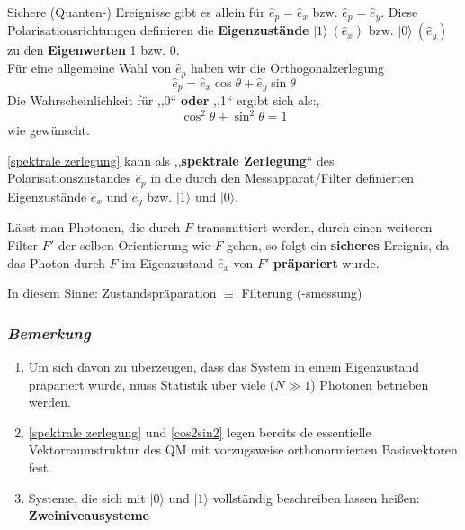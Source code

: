 
\noindent
Sichere (Quanten-) Ereignisse gibt es allein für $ \hat{e}_p = \hat{e}_x $ bzw. $ \hat{e}_p = \hat{e}_y $. Diese Polarisationsrichtungen definieren die \textbf{Eigenzustände} $ |1\rangle \ (\hat{e}_x) $ bzw. $ |0\rangle \ (\hat{e}_y) $ zu den \textbf{Eigenwerten} 1 bzw. 0.\\[10pt]
Für eine allgemeine Wahl von $ \hat{e}_p $ haben wir die Orthogonalzerlegung 
\begin{equation}
\hat{e}_p = \hat{e}_x \cos\theta + \hat{e}_y \sin 
\theta
\label{spektrale zerlegung}
\end{equation}
Die Wahrscheinlichkeit für ,,0`` \textbf{oder} ,,1`` ergibt sich als:,
\begin{equation}
\cos^2 \theta + \sin^2 \theta = 1
\label{cos2sin2}
\end{equation}
wie gewünscht.\par
\eqref{spektrale zerlegung} kann als ,,\textbf{spektrale Zerlegung}`` des Polarisationszustandes $ \hat{e}_p $ in die durch den Messapparat/Filter definierten Eigenzustände $ \hat{e}_x $ und $ \hat{e}_y $ bzw. $ |1\rangle $ und $ |0\rangle $.\par
Lässt man Photonen, die durch $ F $ transmittiert werden, durch einen weiteren Filter $ F' $ der selben Orientierung wie $ F $ gehen, so folgt ein \textbf{sicheres} Ereignis, da das Photon durch $ F $ im Eigenzustand $ \hat{e}_x $ von $ F' $ \textbf{präpariert} wurde.\par
In diesem Sinne: Zustandspräparation $ \equiv $ Filterung (-smessung)

\subsubsection*{\emph{Bemerkung}}

\begin{enumerate}[(1)]
	\item Um sich davon zu überzeugen, dass das System in einem Eigenzustand präpariert wurde, muss Statistik über viele ($ N \gg 1 $) Photonen betrieben werden.
	\item \eqref{spektrale zerlegung} und \eqref{cos2sin2} legen bereits de essentielle Vektorraumstruktur des QM mit vorzugsweise orthonormierten Basisvektoren fest.
	\item Systeme, die sich mit $ |0\rangle $ und $ |1\rangle $ vollständig beschreiben lassen heißen: \textbf{Zweiniveausysteme}
\end{enumerate}